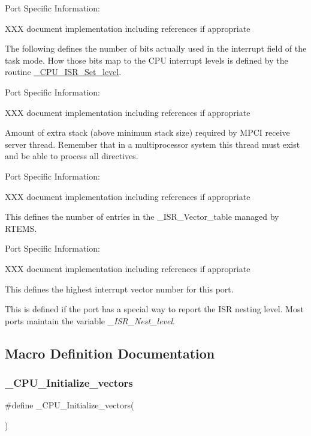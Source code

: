 Port Specific Information\+:

X\+XX document implementation including references if appropriate

The following defines the number of bits actually used in the interrupt field of the task mode. How those bits map to the C\+PU interrupt levels is defined by the routine \mbox{\hyperlink{group__RTEMSScoreCPUARM_ga43820ba3d51d7a699c22fce8cac93ef1}{\+\_\+\+C\+P\+U\+\_\+\+I\+S\+R\+\_\+\+Set\+\_\+level}}.

Port Specific Information\+:

X\+XX document implementation including references if appropriate

Amount of extra stack (above minimum stack size) required by M\+P\+CI receive server thread. Remember that in a multiprocessor system this thread must exist and be able to process all directives.

Port Specific Information\+:

X\+XX document implementation including references if appropriate

This defines the number of entries in the \+\_\+\+I\+S\+R\+\_\+\+Vector\+\_\+table managed by R\+T\+E\+MS.

Port Specific Information\+:

X\+XX document implementation including references if appropriate

This defines the highest interrupt vector number for this port.

This is defined if the port has a special way to report the I\+SR nesting level. Most ports maintain the variable {\itshape \+\_\+\+I\+S\+R\+\_\+\+Nest\+\_\+level}. 

\subsection{Macro Definition Documentation}
\mbox{\label{group__RTEMSScoreCPUlm32Interrupt_gad1ef5062849284d81496e1e6d33fb7ff}} 
\subsubsection{\texorpdfstring{\_CPU\_Initialize\_vectors}{\_CPU\_Initialize\_vectors}}
{\footnotesize\ttfamily \#define \+\_\+\+C\+P\+U\+\_\+\+Initialize\+\_\+vectors(\begin{DoxyParamCaption}{ }\end{DoxyParamCaption})}


